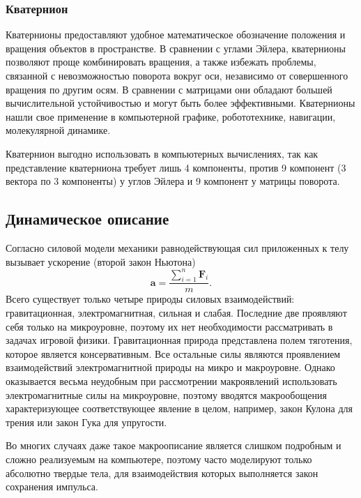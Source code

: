 \subsubsection{Кватернион}
Кватернионы предоставляют удобное математическое обозначение положения и вращения объектов в пространстве.
В сравнении с углами Эйлера, кватернионы позволяют проще комбинировать вращения, а также избежать проблемы,
связанной с невозможностью поворота вокруг оси, независимо от совершенного вращения по другим осям.
В сравнении с матрицами они обладают большей вычислительной устойчивостью и могут быть более эффективными.
Кватернионы нашли свое применение в компьютерной графике, робототехнике, навигации, молекулярной динамике.

Кватернион выгодно использовать в компьютерных вычислениях, так как представление кватерниона требует
лишь 4 компоненты, против 9 компонент (3 вектора по 3 компоненты) у углов Эйлера и 9 компонент у матрицы поворота.

\subsection{Динамическое описание}
Согласно силовой модели механики равнодействующая сил приложенных к телу вызывает ускорение (второй закон Ньютона)
\begin{equation}
 \mathbf{a}=\frac{\sum\limits_{i=1}^n{\mathbf{F}_i}}{m}.
\end{equation}
Всего существует только четыре природы силовых взаимодействий: гравитационная, электромагнитная, сильная и слабая.
Последние две проявляют себя только на микроуровне, поэтому их нет необходимости рассматривать в задачах
игровой физики. Гравитационная природа представлена полем тяготения, которое является консервативным. 
Все остальные силы являются проявлением взаимодействий электромагнитной природы на микро и макроуровне.
Однако оказывается весьма неудобным при рассмотрении макроявлений использовать электромагнитные силы на микроуровне,
поэтому вводятся макрообощения характеризующее соответствующее явление в целом, например, закон Кулона
для трения или закон Гука для упругости.

Во многих случаях даже такое макроописание является слишком подробным и сложно реализуемым на компьютере,
поэтому часто моделируют только абсолютно твердые тела, для взаимодействия которых выполняется закон 
сохранения импульса.
